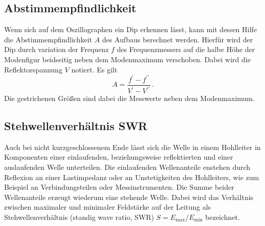 \subsection{Abstimmempfindlichkeit}
\label{subsec:empfindlichkeit}
Wenn sich auf dem Oszillographen ein Dip erkennen lässt, kann mit dessen Hilfe
die Abstimmempfindlichkeit $A$ des Aufbaus berechnet werden.
Hierfür wird der Dip durch variation der Frequenz $f$ des Frequenzmessers auf
die halbe Höhe der Modenfigur beidseitig neben dem Modenmaximum verschoben.
Dabei wird die Reflektorspannung $V$ notiert.
Es gilt
\begin{equation}
    \label{eqn:empfindlichkeit}
    A = \frac{f^\prime - f^{\prime\prime}}{V^\prime - V^{\prime\prime}}\,.
\end{equation}
Die gestrichenen Größen sind dabei die Messwerte neben dem Modenmaximum.

\subsection{Stehwellenverhältnis SWR}
\label{subsec:swr}
Auch bei nicht kurzgeschlossenem Ende lässt sich die Welle in einem Hohlleiter
in Komponenten einer einlaufenden, beziehungsweise reflektierten und einer
auslaufenden Welle unterteilen.
Die einlaufenden Wellenanteile enstehen durch Reflexion an einer Lastimpedanz
oder an Unstetigkeiten des Hohlleiters, wie zum Beispiel an Verbindungsteilen
oder Messinstrumenten.
Die Summe beider Wellenanteile erzeugt wiederum eine stehende Welle.
Dabei wird das Verhältnis zwischen maximaler und minimaler Feldstärke
auf der Leitung als Stehwellenverhältnis (standig wave ratio, SWR)
$S = E_\text{max}/E_\text{min}$ bezeichnet.

